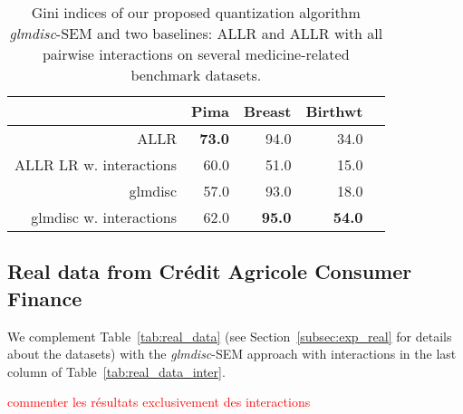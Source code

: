 \begin{table}[t]
\begin{center}
\caption{Gini indices of our proposed quantization algorithm \textit{glmdisc}-SEM and two baselines: ALLR and ALLR with all pairwise interactions on several medicine-related benchmark datasets.}
\label{tab:banchmark_medicine}
\begin{adjustbox}{max width=0.99\textwidth}
\begin{tabular}{rrrrr}
 & Pima & Breast & Birthwt \\ 
  \hline
ALLR & {\textbf{73.0}} & 94.0 & 34.0 \\ 
ALLR LR w. interactions & 60.0 & 51.0 & 15.0 \\ 
glmdisc & 57.0 & 93.0 & 18.0 \\ 
glmdisc w. interactions & 62.0 & {\textbf{95.0}} & {\textbf{54.0}} \\ 
\end{tabular}
\end{adjustbox}
\end{center}
\end{table}


\subsection{Real data from Crédit Agricole Consumer Finance}

We complement Table~\ref{tab:real_data} (see Section~\ref{subsec:exp_real} for details about the datasets) with the \textit{glmdisc}-SEM approach with interactions in the last column of Table~\ref{tab:real_data_inter}.

\textcolor{red}{commenter les résultats exclusivement des interactions}

